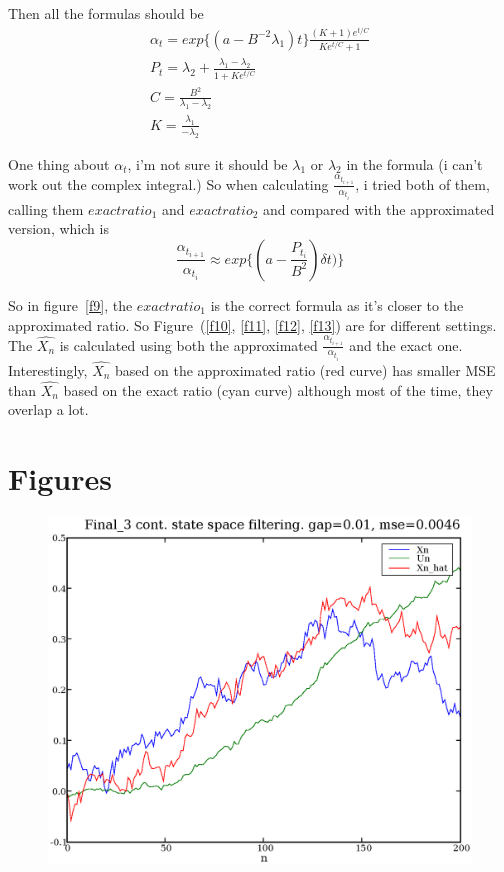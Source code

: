 \documentclass[a4paper,10pt]{article}
\begin{document}
Then all the formulas should be
\begin{eqnarray}
\alpha_t = exp\{(a-B^{-2}\lambda_1)t\}\frac{(K+1)e^{t/C}}{Ke^{t/C}+1} \\
P_t = \lambda_2 + \frac{\lambda_1 - \lambda_2}{1+Ke^{t/C}} \\
C = \frac{B^2}{\lambda_1 - \lambda_2} \\
K = \frac{\lambda_1}{-\lambda_2}
\end{eqnarray}

One thing about $\alpha_t$, i'm not sure it should be $\lambda_1$ or $\lambda_2$ in the formula (i can't work out the complex integral.) So when calculating $\frac{\alpha_{t_{i+1}}}{\alpha_{t_i}}$, i tried both of them, calling them ${exactratio}_1$ and ${exactratio}_2$ and compared with the approximated version, which is
\begin{equation}
\frac{\alpha_{t_{i+1}}}{\alpha_{t_i}} \approx exp\{(a-\frac{P_{t_i}}{B^2})\delta t)\}
\end{equation}

So in figure~\ref{f9}, the ${exactratio}_1$ is the correct formula as it's closer to the approximated ratio. So Figure~(\ref{f10}, \ref{f11}, \ref{f12}, \ref{f13}) are for different settings. The $\hat{X_n}$ is calculated using both the approximated $\frac{\alpha_{t_{i+1}}}{\alpha_{t_i}}$ and the exact one. Interestingly, $\hat{X_n}$ based on the approximated ratio (red curve) has smaller MSE than $\hat{X_n}$ based on the exact ratio (cyan curve) although most of the time, they overlap a lot.

\section{Figures}
\begin{figure}
\includegraphics[width=1\textwidth]{Final_3_Xn_Un_Xn_hat_gap_0.01.eps}
\caption{}\label{f1}
\end{figure}
\end{document}
